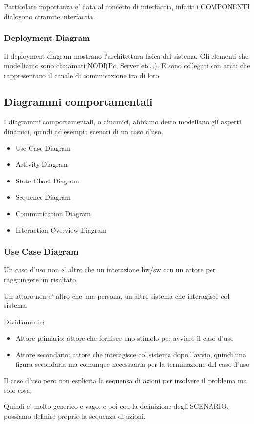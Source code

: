 Particolare importanza e' data al concetto di interfaccia, infatti i COMPONENTI dialogono ctramite interfaccia.

\subsubsection{Deployment Diagram}
Il deployment diagram mostrano l'architettura fisica del sistema.
Gli elementi che modelliamo sono chaiamati NODI(Pc, Server etc\dots). E sono collegati con archi
che rappresentano il canale di comunicazione tra di loro.

\subsection{Diagrammi comportamentali}
I diagrammi comportamentali, o dinamici, abbiamo detto modellano gli aspetti dinamici, quindi ad esempio
scenari di un caso d'uso.

\begin{itemize}
    \item Use Case Diagram
    \item Activity Diagram
    \item State Chart Diagram
    \item Sequence Diagram
    \item Communication Diagram
    \item Interaction Overview Diagram
\end{itemize}
\subsubsection{Use Case Diagram}
Un caso d'uso non e' altro che un interazione hw/sw con un attore per raggiungere un risultato.

Un attore non e' altro che una persona, un altro sistema che interagisce col sistema.

Dividiamo in:
\begin{itemize}
    \item Attore primario: attore che fornisce uno stimolo per avviare il caso d'uso 
    \item Attore secondario: attore che interagisce col sistema dopo l'avvio, quindi una figura secondaria
        ma comunque necessaaria per la terminazione del caso d'uso
\end{itemize}
Il caso d'uso pero non esplicita la sequenza di azioni per irsolvere il problema  ma solo cosa.

Quindi e' molto generico e vago, e poi con la definizione degli SCENARIO, possiamo definire proprio
la sequenza di azioni.

